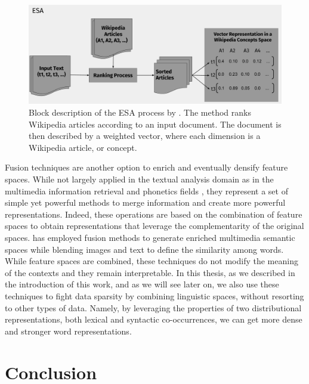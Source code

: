 \begin{figure}
\centering
\includegraphics[width=\linewidth]{images/Chapitre2/esa.pdf}
\caption{Block description of the ESA process by \cite{gabrilovich2007computing}. The method ranks Wikipedia articles according to an input document. The document is then described by a weighted vector, where each dimension is a Wikipedia article, or concept.}
\label{fig:esa}
\end{figure}

Fusion techniques are another option to enrich and eventually densify feature spaces.  While not largely applied in the textual analysis domain as in the multimedia information retrieval and phonetics fields \cite{ozkan2010latent,Ah-PineCC15}, they represent a set of simple yet powerful methods to merge information and create more powerful representations. Indeed, these operations are based on the combination of feature spaces  to obtain representations that leverage the complementarity of the original spaces. \cite{bruni2014multimodal} has employed fusion methods to generate enriched multimedia semantic spaces while blending images and text to define the similarity among words. While feature spaces are combined, these techniques do not modify the meaning of the contexts and they remain interpretable. In this thesis, as we described in the introduction of this work, and as we will see later on, we also use these techniques to fight data sparsity by combining linguistic spaces, without resorting to other types of data. Namely,  by leveraging the properties of two distributional representations, both lexical and syntactic co-occurrences, we can get more dense and stronger  word representations. 


\section{Conclusion}

